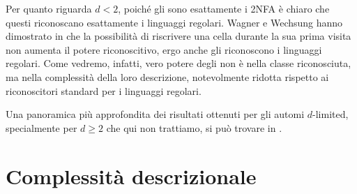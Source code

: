 Per quanto riguarda $d<2$, poiché gli  sono esattamente i 2NFA è chiaro che questi riconoscano esattamente i linguaggi regolari. Wagner e Wechsung hanno dimostrato in \cite{Wagner:86:compCompl} che la possibilità di riscrivere una cella durante la sua prima visita non aumenta il potere riconoscitivo, ergo anche gli  riconoscono i linguaggi regolari. Come vedremo, infatti, vero potere degli  non è nella classe riconosciuta, ma nella complessità della loro descrizione, notevolmente ridotta rispetto ai riconoscitori standard per i linguaggi regolari.

Una panoramica più approfondita dei risultati ottenuti per gli automi $d$-limited, specialmente per $d\geq2$ che qui non trattiamo, si può trovare in \cite{Pighizzini:19:limited}.



\section{Complessità descrizionale}
